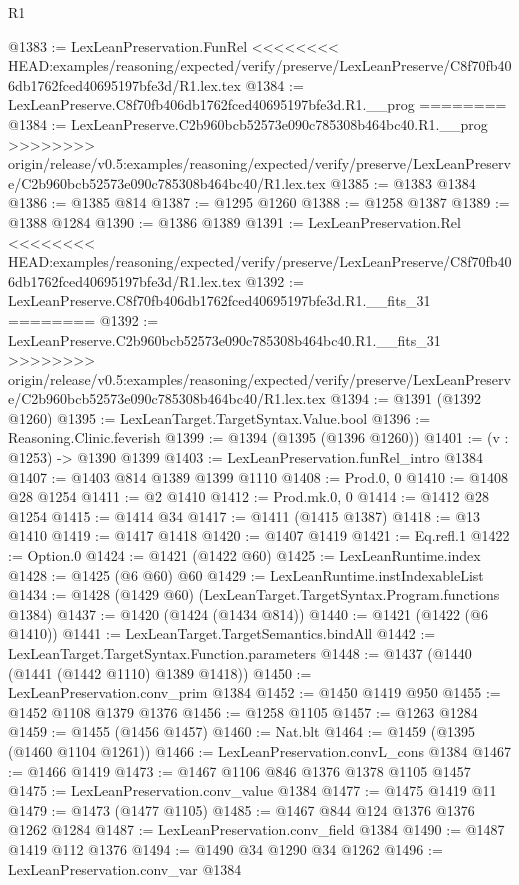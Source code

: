 \begin{lexlean}{R1}
\begin{coremodule}
{{{{{{{{{{{{{{{{{{{{{{{{{{{{{{{{{{{{{{{{{{{{{{{{{{{{{{{{{{{{{{{{{{{{{{{{{{{{{{{{{{{{{{{{{{@1383 := LexLeanPreservation.FunRel
<<<<<<<< HEAD:examples/reasoning/expected/verify/preserve/LexLeanPreserve/C8f70fb406db1762fced40695197bfe3d/R1.lex.tex
@1384 := LexLeanPreserve.C8f70fb406db1762fced40695197bfe3d.R1.__prog
========
@1384 := LexLeanPreserve.C2b960bcb52573e090c785308b464bc40.R1.__prog
>>>>>>>> origin/release/v0.5:examples/reasoning/expected/verify/preserve/LexLeanPreserve/C2b960bcb52573e090c785308b464bc40/R1.lex.tex
@1385 := @1383 @1384
@1386 := @1385 @814
@1387 := @1295 @1260
@1388 := @1258 @1387
@1389 := @1388 @1284
@1390 := @1386 @1389
@1391 := LexLeanPreservation.Rel
<<<<<<<< HEAD:examples/reasoning/expected/verify/preserve/LexLeanPreserve/C8f70fb406db1762fced40695197bfe3d/R1.lex.tex
@1392 := LexLeanPreserve.C8f70fb406db1762fced40695197bfe3d.R1.__fits_31
========
@1392 := LexLeanPreserve.C2b960bcb52573e090c785308b464bc40.R1.__fits_31
>>>>>>>> origin/release/v0.5:examples/reasoning/expected/verify/preserve/LexLeanPreserve/C2b960bcb52573e090c785308b464bc40/R1.lex.tex
@1394 := @1391 (@1392 @1260)
@1395 := LexLeanTarget.TargetSyntax.Value.bool
@1396 := Reasoning.Clinic.feverish
@1399 := @1394 (@1395 (@1396 @1260))
@1401 := (v : @1253) -> @1390 @1399
@1403 := LexLeanPreservation.funRel_intro @1384
@1407 := @1403 @814 @1389 @1399 @1110
@1408 := Prod.{0, 0}
@1410 := @1408 @28 @1254
@1411 := @2 @1410
@1412 := Prod.mk.{0, 0}
@1414 := @1412 @28 @1254
@1415 := @1414 @34
@1417 := @1411 (@1415 @1387)
@1418 := @13 @1410
@1419 := @1417 @1418
@1420 := @1407 @1419
@1421 := Eq.refl.{1}
@1422 := Option.{0}
@1424 := @1421 (@1422 @60)
@1425 := LexLeanRuntime.index
@1428 := @1425 (@6 @60) @60
@1429 := LexLeanRuntime.instIndexableList
@1434 := @1428 (@1429 @60) (LexLeanTarget.TargetSyntax.Program.functions @1384)
@1437 := @1420 (@1424 (@1434 @814))
@1440 := @1421 (@1422 (@6 @1410))
@1441 := LexLeanTarget.TargetSemantics.bindAll
@1442 := LexLeanTarget.TargetSyntax.Function.parameters
@1448 := @1437 (@1440 (@1441 (@1442 @1110) @1389 @1418))
@1450 := LexLeanPreservation.conv_prim @1384
@1452 := @1450 @1419 @950
@1455 := @1452 @1108 @1379 @1376
@1456 := @1258 @1105
@1457 := @1263 @1284
@1459 := @1455 (@1456 @1457)
@1460 := Nat.blt
@1464 := @1459 (@1395 (@1460 @1104 @1261))
@1466 := LexLeanPreservation.convL_cons @1384
@1467 := @1466 @1419
@1473 := @1467 @1106 @846 @1376 @1378 @1105 @1457
@1475 := LexLeanPreservation.conv_value @1384
@1477 := @1475 @1419 @11
@1479 := @1473 (@1477 @1105)
@1485 := @1467 @844 @124 @1376 @1376 @1262 @1284
@1487 := LexLeanPreservation.conv_field @1384
@1490 := @1487 @1419 @112 @1376
@1494 := @1490 @34 @1290 @34 @1262
@1496 := LexLeanPreservation.conv_var @1384
}}}}}}}}}}}}}}}}}}}}}}}}}}}}}}}}}}}}}}}}}}}}}}}}}}}}}}}}}}}}}}}}}}}}}}}}}}}}}}}}}}}}}}}}}}
\end{coremodule}
\end{lexlean}
